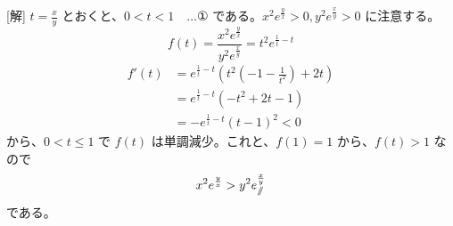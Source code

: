 \documentclass[../main.tex]{subfiles}
\begin{document}
[解] $t = \frac{x}{y}$ とおくと、$0 < t < 1 \quad \dots \text{①}$ である。$x^2 e^{\frac{y}{x}} > 0, y^2 e^{\frac{x}{y}} > 0$ に注意する。
\[
  f(t) = \frac{x^2 e^{\frac{y}{x}}}{y^2 e^{\frac{x}{y}}} = t^2 e^{\frac{1}{t} - t}
\]
\begin{align*}
  f'(t) &= e^{\frac{1}{t} - t} \left( t^2 \left(-1 - \frac{1}{t^2}\right) + 2t \right) \\
  &= e^{\frac{1}{t} - t} (-t^2 + 2t - 1) \\
  &= -e^{\frac{1}{t} - t} (t - 1)^2 < 0
\end{align*}
から、$0 < t \le 1$ で $f(t)$ は単調減少。これと、$f(1) = 1$ から、$f(t) > 1$ なので
\[
  x^2 e^{\frac{y}{x}} > y^2 e^{\frac{x}{y}}_{\mathbin{/\mkern-6mu/}}
\]
である。
\end{document}
